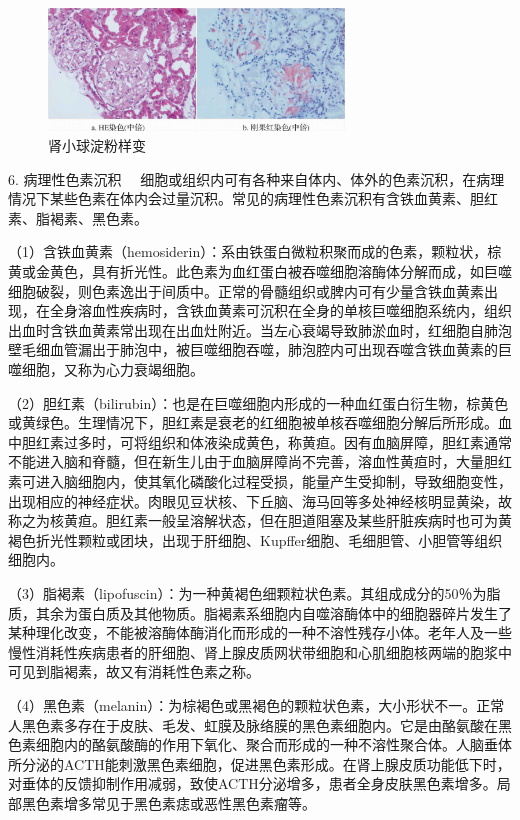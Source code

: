 \begin{figure}[!htbp]
	\centering
    \includegraphics[width=0.7\textwidth]{./images/Image00012.jpg}
	\caption{肾小球淀粉样变}
	\label{fig1-11} 
	\end{figure} 

{6. 病理性色素沉积}
　细胞或组织内可有各种来自体内、体外的色素沉积，在病理情况下某些色素在体内会过量沉积。常见的病理性色素沉积有含铁血黄素、胆红素、脂褐素、黑色素。

（1）含铁血黄素（hemosiderin）：系由铁蛋白微粒积聚而成的色素，颗粒状，棕黄或金黄色，具有折光性。此色素为血红蛋白被吞噬细胞溶酶体分解而成，如巨噬细胞破裂，则色素逸出于间质中。正常的骨髓组织或脾内可有少量含铁血黄素出现，在全身溶血性疾病时，含铁血黄素可沉积在全身的单核巨噬细胞系统内，组织出血时含铁血黄素常出现在出血灶附近。当左心衰竭导致肺淤血时，红细胞自肺泡壁毛细血管漏出于肺泡中，被巨噬细胞吞噬，肺泡腔内可出现吞噬含铁血黄素的巨噬细胞，又称为心力衰竭细胞。

（2）胆红素（bilirubin）：也是在巨噬细胞内形成的一种血红蛋白衍生物，棕黄色或黄绿色。生理情况下，胆红素是衰老的红细胞被单核吞噬细胞分解后所形成。血中胆红素过多时，可将组织和体液染成黄色，称黄疸。因有血脑屏障，胆红素通常不能进入脑和脊髓，但在新生儿由于血脑屏障尚不完善，溶血性黄疸时，大量胆红素可进入脑细胞内，使其氧化磷酸化过程受损，能量产生受抑制，导致细胞变性，出现相应的神经症状。肉眼见豆状核、下丘脑、海马回等多处神经核明显黄染，故称之为核黄疸。胆红素一般呈溶解状态，但在胆道阻塞及某些肝脏疾病时也可为黄褐色折光性颗粒或团块，出现于肝细胞、Kupffer细胞、毛细胆管、小胆管等组织细胞内。

（3）脂褐素（lipofuscin）：为一种黄褐色细颗粒状色素。其组成成分的50％为脂质，其余为蛋白质及其他物质。脂褐素系细胞内自噬溶酶体中的细胞器碎片发生了某种理化改变，不能被溶酶体酶消化而形成的一种不溶性残存小体。老年人及一些慢性消耗性疾病患者的肝细胞、肾上腺皮质网状带细胞和心肌细胞核两端的胞浆中可见到脂褐素，故又有消耗性色素之称。

（4）黑色素（melanin）：为棕褐色或黑褐色的颗粒状色素，大小形状不一。正常人黑色素多存在于皮肤、毛发、虹膜及脉络膜的黑色素细胞内。它是由酪氨酸在黑色素细胞内的酪氨酸酶的作用下氧化、聚合而形成的一种不溶性聚合体。人脑垂体所分泌的ACTH能刺激黑色素细胞，促进黑色素形成。在肾上腺皮质功能低下时，对垂体的反馈抑制作用减弱，致使ACTH分泌增多，患者全身皮肤黑色素增多。局部黑色素增多常见于黑色素痣或恶性黑色素瘤等。

